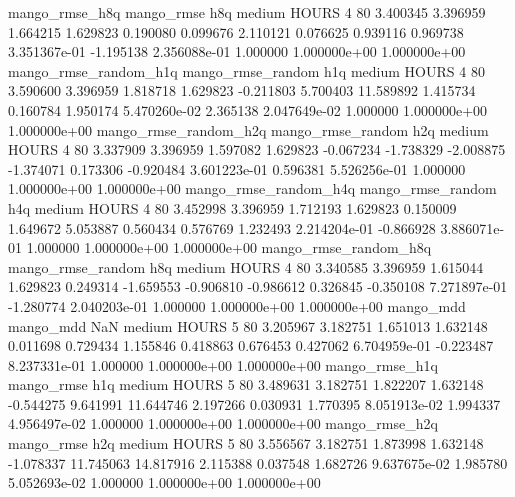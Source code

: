        mango_rmse_h8q        mango_rmse                  h8q     medium    HOURS                 4 80  3.400345       3.396959 1.664215       1.629823    0.190080      0.099676      2.110121     0.076625       0.939116  0.969738 3.351367e-01    -1.195138   2.356088e-01            1.000000    1.000000e+00        1.000000e+00
mango_rmse_random_h1q mango_rmse_random                  h1q     medium    HOURS                 4 80  3.590600       3.396959 1.818718       1.629823   -0.211803      5.700403     11.589892     1.415734       0.160784  1.950174 5.470260e-02     2.365138   2.047649e-02            1.000000    1.000000e+00        1.000000e+00
mango_rmse_random_h2q mango_rmse_random                  h2q     medium    HOURS                 4 80  3.337909       3.396959 1.597082       1.629823   -0.067234     -1.738329     -2.008875    -1.374071       0.173306 -0.920484 3.601223e-01     0.596381   5.526256e-01            1.000000    1.000000e+00        1.000000e+00
mango_rmse_random_h4q mango_rmse_random                  h4q     medium    HOURS                 4 80  3.452998       3.396959 1.712193       1.629823    0.150009      1.649672      5.053887     0.560434       0.576769  1.232493 2.214204e-01    -0.866928   3.886071e-01            1.000000    1.000000e+00        1.000000e+00
mango_rmse_random_h8q mango_rmse_random                  h8q     medium    HOURS                 4 80  3.340585       3.396959 1.615044       1.629823    0.249314     -1.659553     -0.906810    -0.986612       0.326845 -0.350108 7.271897e-01    -1.280774   2.040203e-01            1.000000    1.000000e+00        1.000000e+00
            mango_mdd         mango_mdd                  NaN     medium    HOURS                 5 80  3.205967       3.182751 1.651013       1.632148    0.011698      0.729434      1.155846     0.418863       0.676453  0.427062 6.704959e-01    -0.223487   8.237331e-01            1.000000    1.000000e+00        1.000000e+00
       mango_rmse_h1q        mango_rmse                  h1q     medium    HOURS                 5 80  3.489631       3.182751 1.822207       1.632148   -0.544275      9.641991     11.644746     2.197266       0.030931  1.770395 8.051913e-02     1.994337   4.956497e-02            1.000000    1.000000e+00        1.000000e+00
       mango_rmse_h2q        mango_rmse                  h2q     medium    HOURS                 5 80  3.556567       3.182751 1.873998       1.632148   -1.078337     11.745063     14.817916     2.115388       0.037548  1.682726 9.637675e-02     1.985780   5.052693e-02            1.000000    1.000000e+00        1.000000e+00
